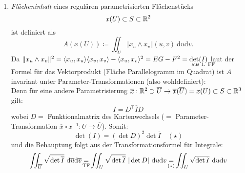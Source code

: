 \begin{remark}
\begin{enumerate}
  \item \emph{Flächeninhalt} eines regulären parametrisierten Flächenstücks
  \begin{equation*}
    x(U) \subset S \subset \mathbb{R}^2
  \end{equation*}
  ist definiert als
  \begin{equation*}
    A(x(U)) \coloneqq \iint_U \Vert x_u \wedge x_v \Vert (u,v) \ \text{d}u\text{d}v\text{.}
  \end{equation*}
  Da $ \Vert x_u \wedge x_v \Vert^2 = \langle x_u, x_u \rangle \langle x_v,x_v \rangle - \langle x_u, x_v \rangle^2 = EG - F^2 = \det(\underset{\mathclap{\text{aus 1. FF}}}{I}) $ laut der Formel für das Vektorprodukt (Fläche Parallelogramm im Quadrat) ist $ A $ invariant unter Parameter-Transformationen (also wohldefiniert): \\
  Denn für eine andere Parametrisierung $ \overline{x}: \mathbb{R}^2 \supset \overline{U} \to \overline{x}(\overline{U}) = x(U) \subset S \subset \mathbb{R}^3 $ gilt:
  \begin{equation*}
    I = D^\top \overline{I} D
  \end{equation*}
  wobei $ D = $ Funktionalmatrix des Kartenwechsels ($ = $ Parameter-Transformation $ \overline{x} \circ x^{-1} : U \to \overline{U} $). Somit:
  \begin{equation*}
    \det(I) = \left( \det D \right)^2 \det \overline{I} \quad (\star)
  \end{equation*}
  und die Behauptung folgt aus der Transformationsformel für Integrale:
  \begin{equation*}
    \iint_{\overline{U}} \sqrt{\det \overline{I}} \ \text{d}\overline{u}\text{d}\overline{v} \underset{\mathclap{\text{TF}}}{=} \iint_U \sqrt{\det \overline{I}} \ \vert \det D \vert \ \text{d}u\text{d}v \underset{\mathclap{(\star)}}{=} \iint_U \sqrt{\det I} \ \text{d}u\text{d}v
  \end{equation*}
 \end{enumerate}
\end{remark}

